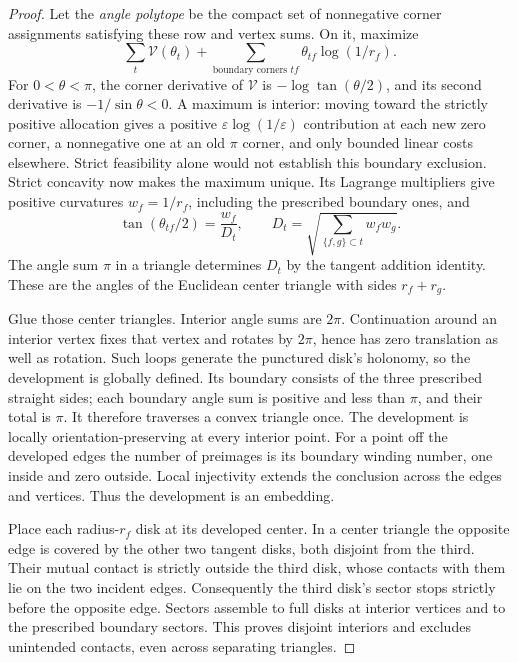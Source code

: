 \documentclass[11pt]{article}
\numberwithin{equation}{section}
\theoremstyle{definition}
\theoremstyle{remark}
\begin{document}
\begin{proof}
Let the \emph{angle polytope} be the compact set of nonnegative
corner assignments satisfying these row and vertex sums. On it,
maximize
\[
       \sum_t\mathcal V(\theta_t)
          +\sum_{\text{boundary corners }tf}\theta_{tf}\log(1/r_f).
\]
For \(0<\theta<\pi\), the corner derivative of \(\mathcal V\) is
\(-\log\tan(\theta/2)\), and its second derivative is
\(-1/\sin\theta<0\). A maximum is interior: moving toward the
strictly positive allocation gives a positive
\(\varepsilon\log(1/\varepsilon)\) contribution at each new zero
corner, a nonnegative one at an old \(\pi\) corner, and only bounded
linear costs elsewhere. Strict feasibility alone would not establish
this boundary exclusion. Strict concavity now makes the maximum unique.
Its Lagrange multipliers give positive curvatures \(w_f=1/r_f\),
including the prescribed boundary ones, and
\begin{equation}\label{mf:angles}
 \tan(\theta_{tf}/2)=\frac{w_f}{D_t},\qquad
 D_t=\sqrt{\sum_{\{f,g\}\subset t}w_fw_g}.
\end{equation}
The angle sum \(\pi\) in a triangle determines \(D_t\) by the tangent addition
identity. These are the angles of the Euclidean center triangle
with sides \(r_f+r_g\).

Glue those center triangles. Interior angle sums are \(2\pi\).
Continuation around an interior vertex fixes that vertex and rotates
by \(2\pi\), hence has zero translation as well as rotation.
Such loops generate the punctured disk's holonomy, so the development
is globally defined. Its boundary consists of the three prescribed
straight sides; each boundary angle sum is positive and less than
\(\pi\), and their total is \(\pi\). It therefore traverses a convex
triangle once. The development is locally orientation-preserving at
every interior point. For a point off the developed edges the number
of preimages is its boundary winding number, one inside and zero
outside. Local injectivity extends the conclusion across the edges
and vertices. Thus the development is an embedding.

Place each radius-\(r_f\) disk at its developed center. In a center
triangle the opposite edge is covered by the other two tangent disks,
both disjoint from the third. Their mutual contact is strictly outside
the third disk, whose contacts with them lie on the two incident edges.
Consequently the third disk's sector stops strictly before the opposite
edge. Sectors assemble to full disks at interior vertices and to the
prescribed boundary sectors. This proves disjoint interiors and
excludes unintended contacts, even across separating triangles.


\end{proof}
\end{document}
